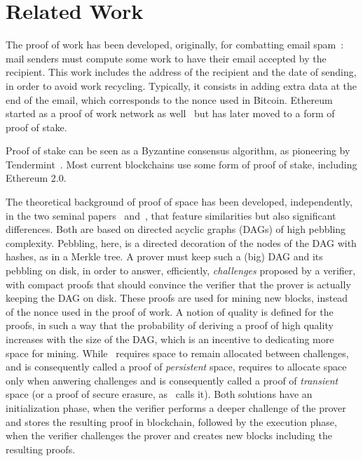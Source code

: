 \section{Related Work}\label{sec:related_work}

The proof of work has been developed, originally, for combatting email spam~\cite{DworkN92}:
mail senders must compute some
work to have their email accepted by the recipient. This work includes
the address of the recipient and the date of sending, in order to avoid
work recycling. Typically, it consists in adding extra data at the end of the email,
which corresponds to the nonce used in Bitcoin.
Ethereum started as a proof of work network as well~\cite{AntonopoulosW18} but has later
moved to a form of proof of stake.

Proof of stake can be seen as a
Byzantine consensus algorithm, as pioneering by Tendermint~\cite{Tendermint14}.
Most current blockchains use some form of proof of stake, including Ethereum 2.0.

The theoretical background of proof of space has been developed, independently,
in the two seminal papers~\cite{AtenieseBFG14} and~\cite{DziembowskiFKP15},
that feature similarities but also significant differences. Both are based
on directed acyclic graphs (DAGs) of high pebbling complexity.
Pebbling, here, is a directed decoration of the nodes of the DAG with hashes, as in
a Merkle tree.
A prover must keep such a (big) DAG and its pebbling on disk, in order to answer, efficiently,
\emph{challenges} proposed by a verifier, with compact proofs that should convince the verifier that
the prover is actually keeping the DAG on disk. These proofs are used for mining new blocks,
instead of the nonce used in the proof of work. A notion of quality is defined for
the proofs, in such a way that the probability of deriving a proof of high quality increases
with the size of the DAG, which is an incentive to dedicating more space for mining.
While~\cite{DziembowskiFKP15} requires space to remain allocated between challenges,
and is consequently called a proof of \emph{persistent} space, \cite{AtenieseBFG14} requires
to allocate space only when anwering challenges and is consequently called
a proof of \emph{transient} space (or a proof of secure erasure, as~\cite{DziembowskiFKP15} calls it).
Both solutions have an initialization phase, when the verifier performs a deeper challenge
of the prover and stores the resulting proof in blockchain, followed by the execution phase,
when the verifier challenges the prover and creates new blocks including the resulting proofs.

